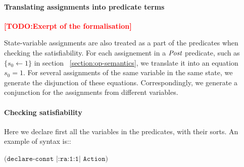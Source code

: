 \documentclass{lncs/llncs}
\newcommand{\TODO}[1]{\textcolor{red}{\textbf{[TODO:#1]}}}
\newcommand{\OTvar}{\texttt}
\newcommand{\Post}{\symb{Post}}
\begin{document}
\paragraph{Translating assignments into predicate terms}
\TODO{Exerpt of the formalisation}


State-variable assignments are also treated as a part of the
predicates when checking the satisfiability. %
For each assignement in a $\Post$ predicate, such as $\{s_0 \leftarrow 1\}$ in section
~\ref{section:op-semantics}, we translate it into an equation
$s_0=1$. For several assignments of the same variable in the same state,
we generate the disjunction of 
these equations. Correspondingly, we generate a conjunction for the
assignments from different variables. 


\paragraph{Checking satisfiability}

Here we declare first all the variables in the predicates, with their
sorts.
An example of syntax is::\\
\centerline{$\OTvar{(declare-const\ |:ra:1:1|\ Action)}$}
\end{document}
